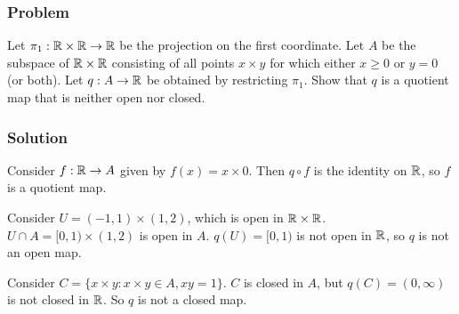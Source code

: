 \subsubsection{Problem}
Let $\pi_1 : \mathbb R \times \mathbb R \to \mathbb R$ be the projection on the first coordinate. Let $A$ be the subspace of $\mathbb R \times \mathbb R$ consisting of all points $x \times y$ for which either $x \geq 0$ or $y = 0$ (or both). Let $q : A \to \mathbb R$ be obtained by restricting $\pi_1$. Show that $q$ is a quotient map that is neither open nor closed.

\subsubsection{Solution}
Consider $f : \mathbb R \to A$ given by $f(x) = x \times 0$. Then $q \circ f$ is the identity on $\mathbb R$, so $f$ is a quotient map.

Consider $U = (-1, 1) \times (1,2)$, which is open in $\mathbb R \times \mathbb R$. $U \cap A = [0,1) \times (1,2)$ is open in $A$. $q(U) = [0,1)$ is not open in $\mathbb R$, so $q$ is not an open map.

Consider $C = \{ x \times y : x \times y \in A, xy=1\}$. $C$ is closed in $A$, but $q(C) = (0, \infty)$ is not closed in $\mathbb R$. So $q$ is not a closed map.
